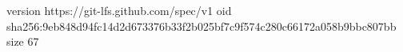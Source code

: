 version https://git-lfs.github.com/spec/v1
oid sha256:9eb848d94fc14d2d673376b33f2b025bf7c9f574c280c66172a058b9bbc807bb
size 67
